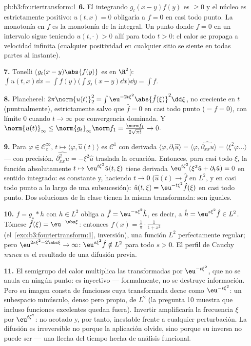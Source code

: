 \begin{solution}{pb:b3:fouriertransform:1}
\textbf{6.} El integrando $g_t(x-y)f(y)$ es $\geq 0$ y el núcleo es
estrictamente positivo: $u(t,x) = 0$ obligaría a $f = 0$ en casi todo
punto. La monotonía en $f$ es la monotonía de la integral. Un punto
donde $f = 0$ en un intervalo sigue teniendo $u(t, \cdot) > 0$ allí para
todo $t > 0$: el calor se propaga a velocidad infinita (cualquier
positividad en cualquier sitio se siente en todas partes al instante).

\textbf{7.} Tonelli ($g_t(x-y)\abs{f(y)}$ es
 en
$\R^2$): $\int u(t,x)\dd x = \int f(y)\bigl(\int g_t(x -
y)\dd x\bigr)\dd y = \int f$.

\textbf{8.} Plancherel: $2\pi\norm{u(t)}_2^2 =
\int\eu^{-2t\xi^2}\abs{\hat f(\xi)}^2\dd\xi$, no creciente en $t$
(puntualmente), estrictamente salvo que $\hat f = 0$ en casi todo punto
($= f =
0$), con límite $0$ cuando $t\to\infty$ por convergencia dominada. Y
$\norm{u(t)}_\infty \leq \norm{g_t}_\infty\norm f_1 =
\frac{\norm f_1}{2\sqrt{\pi t}} \to 0$.

\textbf{9.} Para $\varphi \in \mathcal C_c^\infty$, $t \mapsto
\langle\varphi, \hat u(t)\rangle$ es $\mathcal C^1$ con derivada
$\langle\varphi, \partial_t\hat u\rangle =
\langle\varphi, \widehat{\partial_{xx}u}\rangle =
\langle\xi^2\varphi\dots\rangle$ --- con precisión,
$\widehat{\partial^2_{xx}u} = -\xi^2\hat u$ traslada la ecuación.
Entonces, para casi todo $\xi$, la función absolutamente
$t \mapsto \eu^{t\xi^2}\hat u(t,\xi)$ tiene derivada
$\eu^{t\xi^2}(\xi^2\hat u + \partial_t\hat u) = 0$ en sentido integrado:
es constante y, haciendo $t \to 0$ ($\hat u(t) \to \hat f$ en $L^2$, y
en casi todo punto a lo largo de una subsucesión):
$\hat u(t, \xi) = \eu^{-t\xi^2}\hat f(\xi)$ en casi todo punto. Dos
soluciones de la clase tienen la misma transformada: son iguales.

\textbf{10.} $f = g_s * h$ con $h \in L^2$ obliga a $\hat f =
\eu^{-s\xi^2}\hat h$, es decir, a $\hat h = \eu^{s\xi^2}\hat f \in
L^2$. Tómese $\hat f(\xi) = \eu^{-\abs\xi}$: entonces $f(x) =
\frac1\pi\cdot\frac1{1 + x^2}$ (el~\cref{exo:b3:fouriertransform:1},
inversión), una función $L^2$ perfectamente regular; pero
$\eu^{2s\xi^2 - 2\abs\xi} \to
\infty$: $\eu^{s\xi^2}\hat f \notin L^2$ para todo $s > 0$. El perfil de
Cauchy \emph{nunca} es el resultado de una difusión previa.

\textbf{11.} El semigrupo del calor multiplica las transformadas por
$\eu^{-t\xi^2}$, que no se anula en ningún punto: es inyectivo ---
formalmente, no se destruye información. Pero su imagen consta de
funciones cuya transformada decae como $\eu^{-t\xi^2}$: un subespacio
minúsculo, denso pero propio, de $L^2$ (la pregunta 10 muestra que
incluso funciones excelentes quedan fuera). Invertir amplificaría la
frecuencia $\xi$ por $\eu^{t\xi^2}$: no acotado y, por tanto, inestable
frente a cualquier perturbación. La difusión es irreversible no porque
la aplicación olvide, sino porque su inversa no puede ser
 --- una flecha del tiempo
hecha de análisis funcional.


\end{solution}
